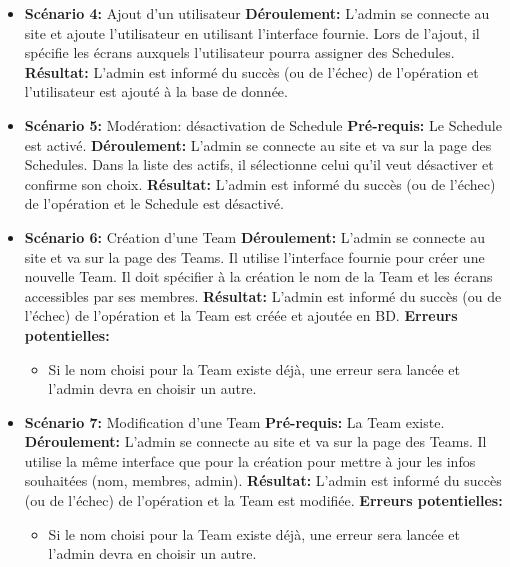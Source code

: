 \documentclass[french]{article}
\begin{document}
\begin{itemize}
		\item \textbf{Scénario 4:} Ajout d'un utilisateur\newline
		\textbf{Déroulement:} L'admin se connecte au site et ajoute l'utilisateur en utilisant l'interface fournie. Lors de l'ajout, il spécifie les écrans auxquels l'utilisateur pourra assigner des Schedules.\newline
		\textbf{Résultat:} L'admin est informé du succès (ou de l'échec) de l'opération et l'utilisateur est ajouté à la base de donnée.\newline

		\item \textbf{Scénario 5:} Modération: désactivation de Schedule\newline
		\textbf{Pré-requis:} Le Schedule est activé.\newline
		\textbf{Déroulement:} L'admin se connecte au site et va sur la page des Schedules. Dans la liste des actifs, il sélectionne celui qu'il veut désactiver et confirme son choix.\newline
		\textbf{Résultat:} L'admin est informé du succès (ou de l'échec) de l'opération et le Schedule est désactivé.\newline
		
		\item \textbf{Scénario 6:} Création d'une Team\newline
		\textbf{Déroulement:} L'admin se connecte au site et va sur la page des Teams. Il utilise l'interface fournie pour créer une nouvelle Team. Il doit spécifier à la création le nom de la Team et les écrans accessibles par ses membres. \newline
		\textbf{Résultat:} L'admin est informé du succès (ou de l'échec) de l'opération et la Team est créée et ajoutée en BD.\newline
		\textbf{Erreurs potentielles:} 
			\begin{itemize}
				\item Si le nom choisi pour la Team existe déjà, une erreur sera lancée et l'admin devra en choisir un autre. 
			\end{itemize}
			
		\item \textbf{Scénario 7:} Modification d'une Team\newline
		\textbf{Pré-requis:} La Team existe.\newline
		\textbf{Déroulement:} L'admin se connecte au site et va sur la page des Teams. Il utilise la même interface que pour la création pour mettre à jour les infos souhaitées (nom, membres, admin).\newline
		\textbf{Résultat:} L'admin est informé du succès (ou de l'échec) de l'opération et la Team est modifiée.\newline
		\textbf{Erreurs potentielles:} 
			\begin{itemize}
				\item Si le nom choisi pour la Team existe déjà, une erreur sera lancée et l'admin devra en choisir un autre. \newline
			\end{itemize}
		

\end{itemize}
\end{document}
